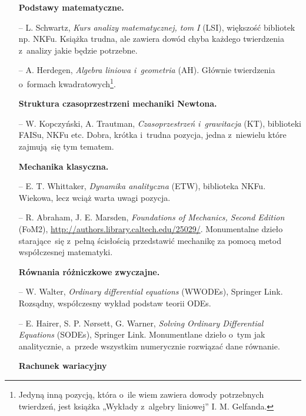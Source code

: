 \documentclass[a4paper,11pt]{article}
\begin{document}
\begin{itemize}
\item[] \textbf{Podstawy matematyczne.}

\item[--] L. Schwartz, \textit{Kurs analizy matematycznej, tom I} (LSI),
  większość bibliotek np. NKFu. Książka trudna, ale zawiera dowód
  chyba każdego twierdzenia z~analizy jakie będzie potrzebne.

\item[--] A. Herdegen, \textit{Algebra liniowa i~geometria} (AH).
  Głównie twierdzenia o~formach kwadratowych\footnote{Jedyną inną
    pozycją, która o~ile wiem zawiera dowody potrzebnych twierdzeń,
    jest książka „Wykłady z~algebry liniowej” I. M. Gelfanda.}.


\item[] \textbf{Struktura czasoprzestrzeni mechaniki Newtona.}

\item[--] W. Kopczyński, A. Trautman, \textit{Czasoprzestrzeń
    i~grawitacja} (KT), biblioteki FAISu, NKFu etc. Dobra, krótka
  i~trudna pozycja, jedna z~niewielu które zajmują~się tym tematem.


\item[] \textbf{Mechanika klasyczna.}

\item[--] E. T. Whittaker, \textit{Dynamika analityczna} (ETW),
  biblioteka NKFu. Wiekowa, lecz wciąż warta uwagi pozycja.

\item[--] R. Abraham, J. E. Marsden, \textit{Foundations of Mechanics,
    Second Edition} (FoM2),
  \url{http://authors.library.caltech.edu/25029/}. Monumentalne
  dzieło starające~się z~pełną ścisłością przedstawić mechanikę za
  pomocą metod współczesnej matematyki.


\item[] \textbf{Równania różniczkowe zwyczajne.}

\item[--] W. Walter, \textit{Ordinary differential equations} (WWODEs),
  Springer Link. Rozsądny, współczesny wykład podstaw teorii ODEs.

\item[--] E. Hairer, S. P. N\o rsett, G. Warner, \textit{Solving Ordinary
    Differential Equations} (SODEs), Springer Link. Monumentlane
  dzieło o~tym jak analitycznie, a~przede wszystkim numerycznie
  rozwiązać dane równanie.


\item[] \textbf{Rachunek wariacyjny}


\end{itemize}
\end{document}
